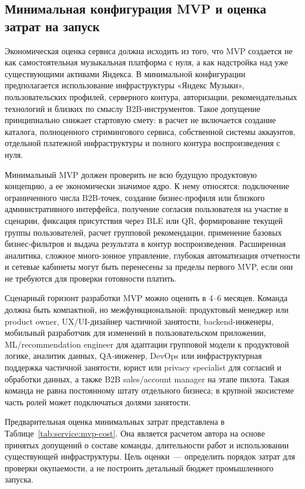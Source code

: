 \subsection{Минимальная конфигурация MVP и оценка затрат на запуск}
\label{subsec:service:monetization:mvp}

Экономическая оценка сервиса должна исходить из того, что MVP создается не как самостоятельная музыкальная платформа с нуля, а как надстройка над уже существующими активами Яндекса. В минимальной конфигурации предполагается использование инфраструктуры «Яндекс Музыки», пользовательских профилей, серверного контура, авторизации, рекомендательных технологий и близких по смыслу B2B-инструментов. Такое допущение принципиально снижает стартовую смету: в расчет не включается создание каталога, полноценного стримингового сервиса, собственной системы аккаунтов, отдельной платежной инфраструктуры и полного контура воспроизведения с нуля.

Минимальный MVP должен проверить не всю будущую продуктовую концепцию, а ее экономически значимое ядро. К нему относятся: подключение ограниченного числа B2B-точек, создание бизнес-профиля или близкого административного интерфейса, получение согласия пользователя на участие в сценарии, фиксация присутствия через BLE или QR, формирование текущей группы пользователей, расчет групповой рекомендации, применение базовых бизнес-фильтров и выдача результата в контур воспроизведения. Расширенная аналитика, сложное много-зонное управление, глубокая автоматизация отчетности и сетевые кабинеты могут быть перенесены за пределы первого MVP, если они не требуются для проверки готовности платить.

Сценарный горизонт разработки MVP можно оценить в 4--6 месяцев. Команда должна быть компактной, но межфункциональной: продуктовый менеджер или product owner, UX/UI-дизайнер частичной занятости, backend-инженеры, мобильный разработчик для изменений в пользовательском приложении, ML/recommendation engineer для адаптации групповой модели к продуктовой логике, аналитик данных, QA-инженер, DevOps или инфраструктурная поддержка частичной занятости, юрист или privacy specialist для согласий и обработки данных, а также B2B sales/account manager на этапе пилота. Такая команда не равна постоянному штату отдельного бизнеса; в крупной экосистеме часть ролей может подключаться долями занятости.

Предварительная оценка минимальных затрат представлена в Таблице~\ref{tab:service:mvp-cost}. Она является расчетом автора на основе принятых допущений о составе команды, длительности работ и использовании существующей инфраструктуры. Цель оценки~--- определить порядок затрат для проверки окупаемости, а не построить детальный бюджет промышленного запуска.

